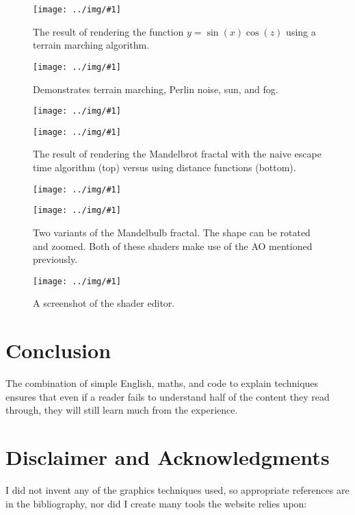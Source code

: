 \documentclass[parskip=half]{scrartcl}
\newcommand\graphic[1]{%
    \centering
    \texttt{[image: ../img/\#1]}%
}
\begin{document}
\begin{figure}[H]
    \graphic{sinxcosz.png}
    \caption{The result of rendering the function $y=\sin(x)\cos(z)$ using a
        terrain marching algorithm.}
    \label{sinxcosz.png}
\end{figure}

\begin{figure}[H]
    \graphic{terrain-marching.png}
    \caption{Demonstrates terrain marching, Perlin noise, sun, and fog.}
    \label{terrain-marching.png}
\end{figure}

\begin{figure}[H]
    \graphic{mandelbrot-escape-time.png}
    \graphic{mandelbrot-dist-func.png}
    \caption{The result of rendering the Mandelbrot fractal with the naive
        escape time algorithm (top) versus using distance functions (bottom).}
    \label{mandelbrot}
\end{figure}

\begin{figure}[H]
    \graphic{mandelbulb2.png}
    \graphic{mandelbulb8.png}
    \caption{Two variants of the Mandelbulb fractal. The shape can be rotated
        and zoomed. Both of these shaders make use of the AO mentioned
        previously.}
    \label{mandelbulb}
\end{figure}

\begin{figure}[H]
    \graphic{editor.png}
    \caption{A screenshot of the shader editor.}
    \label{editor.png}
\end{figure}

\section{Conclusion}

The combination of simple English, maths, and code to explain techniques
ensures that even if a reader fails to understand half of the content they read
through, they will still learn much from the experience.

\section{Disclaimer and Acknowledgments}

I did not invent any of the graphics techniques used, so appropriate references
are in the bibliography, nor did I create many tools the website relies upon:
\end{document}
